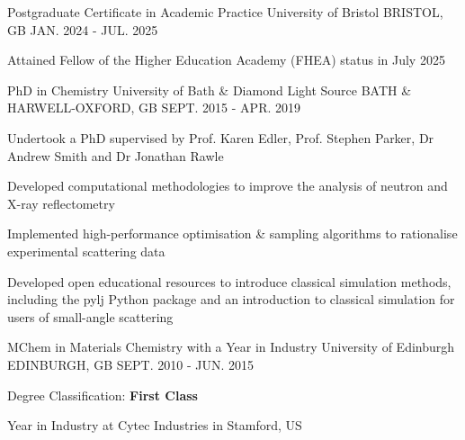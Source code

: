 \begin{cventries}
  \cventry
    {Postgraduate Certificate in Academic Practice}
    {University of Bristol}
    {BRISTOL, GB}
    {JAN. 2024 - JUL. 2025}
    {
      \begin{cvitems}
        \item {Attained Fellow of the Higher Education Academy (FHEA) status in July 2025}
      \end{cvitems}
    }
  \cventry
    {PhD in Chemistry}
    {University of Bath \& Diamond Light Source}
    {BATH \& HARWELL-OXFORD, GB}
    {SEPT. 2015 - APR. 2019}
    {
      \begin{cvitems}
        \item {Undertook a PhD supervised by Prof. Karen Edler, Prof. Stephen Parker, Dr Andrew Smith and Dr Jonathan Rawle}
        \item {Developed computational methodologies to improve the analysis of neutron and X-ray reflectometry}
        \item {Implemented high-performance optimisation \& sampling algorithms to rationalise experimental scattering data}
        \item {Developed open educational resources to introduce classical simulation methods, including the pylj Python package and an introduction to classical simulation for users of small-angle scattering}
      \end{cvitems}
    }
  \cventry
    {MChem in Materials Chemistry with a Year in Industry}
    {University of Edinburgh}
    {EDINBURGH, GB}
    {SEPT. 2010 - JUN. 2015}
    {
      \begin{cvitems}
        \item {Degree Classification: \textbf{First Class}}
        \item {Year in Industry at Cytec Industries in Stamford, US}
      \end{cvitems}
    }
\end{cventries}
